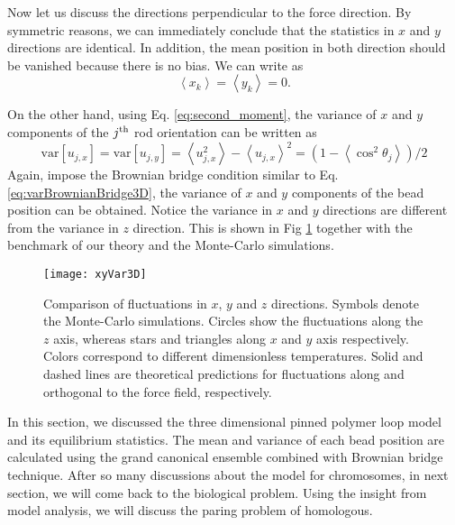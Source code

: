 Now let us discuss the directions perpendicular to the force direction. By symmetric reasons, we can immediately conclude that the statistics in $x$ and $y$ directions are identical. In addition, the mean position in both direction should be vanished because there is no bias. We can write as
\begin{equation}
    \label{eq:xyMean}
    \left<x_k\right> = \left<y_k\right> = 0.
\end{equation}

On the other hand, using Eq. \eqref{eq:second_moment}, the variance of $x$ and $y$ components of the $j^{\rm{th}}$ rod orientation can be written as
\begin{equation}
    \label{eq:xyRodVar}
    \text{var}\left[u_{j,x}\right] = \text{var}\left[u_{j,y}\right] = \left<u_{j,x}^2\right> - \left<u_{j,x}\right>^2 = (1-\left<\cos^2\theta_j\right>)/2
\end{equation}
Again, impose the Brownian bridge condition similar to Eq. \eqref{eq:varBrownianBridge3D}, the variance of $x$ and $y$ components of the bead position can be obtained. Notice the variance in $x$ and $y$ directions are different from the variance in $z$ direction. This is shown in Fig \ref{fig:xyVar3D} together with the benchmark of our theory and the Monte-Carlo simulations.

\begin{figure}[htpb]
    \centering
    \texttt{[image: xyVar3D]}
    \caption{Comparison of fluctuations in $x$, $y$ and $z$ directions. Symbols denote the Monte-Carlo simulations. Circles show the fluctuations along the $z$ axis, whereas stars and triangles along $x$ and $y$ axis respectively. Colors correspond to different dimensionless temperatures. Solid and dashed lines are theoretical predictions for fluctuations along and orthogonal to the force field, respectively.}
    \label{fig:xyVar3D}
\end{figure}

In this section, we discussed the three dimensional pinned polymer loop model and its equilibrium statistics. The mean and variance of each bead position are calculated using the grand canonical ensemble combined with Brownian bridge technique. After so many discussions about the model for chromosomes, in next section, we will come back to the biological problem. Using the insight from model analysis, we will discuss the paring problem of homologous. 


